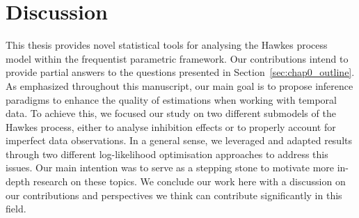 
\chapter{Discussion}






This thesis provides novel statistical tools for analysing the Hawkes process model within the frequentist parametric framework.
Our contributions intend to provide partial answers to the questions presented in Section~\ref{sec:chap0_outline}.
As emphasized throughout this manuscript, our main goal is to propose inference paradigms to enhance the quality of estimations when working with temporal data.
To achieve this, we focused our study on two different submodels of the Hawkes process, either to analyse inhibition effects or to properly account for imperfect data observations.
In a general sense, we leveraged and adapted results through two different log-likelihood optimisation approaches to address this issues.
Our main intention was to serve as a stepping stone to motivate more in-depth research on these topics.
We conclude our work here with a discussion on our contributions and perspectives we think can contribute significantly in this field.

